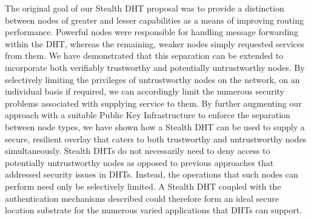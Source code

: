 \documentclass{elsart3p}
\begin{document}
The original goal of our Stealth DHT proposal was to provide a
distinction between nodes of greater and lesser capabilities as a
means of improving routing performance. Powerful nodes were
responsible for handling message forwarding within the DHT, whereas
the remaining, weaker nodes simply requested services from them. We
have demonstrated that this separation can be extended to
incorporate both verifiably trustworthy and potentially
untrustworthy nodes. By selectively limiting the privileges of
untrustworthy nodes on the network, on an individual basis if
required, we can accordingly limit the numerous security problems
associated with supplying service to them. By further augmenting our
approach with a suitable Public Key Infrastructure to enforce the
separation between node types, we have shown how a Stealth DHT can
be used to supply a secure, resilient overlay that caters to both
trustworthy and untrustworthy nodes simultaneously. Stealth DHTs do
not necessarily need to deny access to potentially untrustworthy
nodes as opposed to previous approaches that addressed security
issues in DHTs. Instead, the operations that such nodes can perform
need only be selectively limited. A Stealth DHT coupled with the
authentication mechanisms described could therefore form an ideal
secure location substrate for the numerous varied applications that
DHTs can support.




\end{document}
